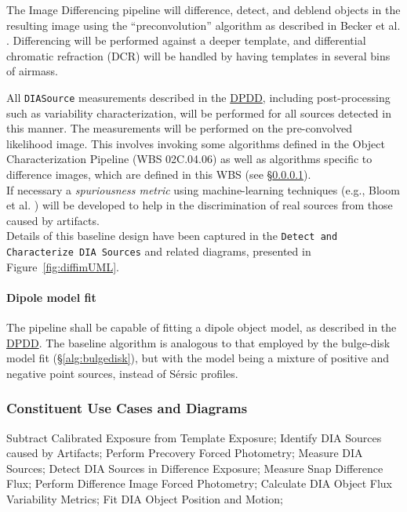 \documentclass[12pt]{article}
\newcommand{\code}[1]{\texttt{#1}}
\newcommand{\DIASource}{\code{DIASource}\xspace}
\newcommand{\ds}[2]{{\color{blue} \href{https://docushare.lsstcorp.org/docushare/dsweb/Get/#1}{#2}}\xspace}
\newcommand{\DPDD}{\ds{LSE-163}{DPDD}}
\newcommand{\wbsObjChar}{WBS 02C.04.06}
\newcommand{\uc}[1]{{\tt #1}}
\begin{document}
The Image Differencing pipeline will difference, detect, and deblend objects in the resulting image using the ``preconvolution'' algorithm as described in Becker et al. \cite{Becker13}.
Differencing will be performed against a deeper template, and differential chromatic refraction (DCR) will be handled by having templates in several bins of airmass.

All \DIASource measurements described in the \DPDD, including post-processing such as variability characterization, will be performed for all sources detected in this manner. The measurements will be performed on the pre-convolved likelihood image. This involves invoking some algorithms defined in the Object Characterization Pipeline (\wbsObjChar{}) as well as algorithms specific to difference images, which are defined in this WBS (see \S\ref{alg:dipole}).
\\

If necessary a \emph{spuriousness metric} using machine-learning techniques (e.g., Bloom et al. \cite{Bloom12}) will be developed to help in the discrimination of real sources from those caused by artifacts.
\\

Details of this baseline design have been captured in the \uc{Detect and Characterize DIA Sources} and related diagrams, presented in Figure~\ref{fig:diffimUML}.

\paragraph{Dipole model fit}
\label{alg:dipole}

The pipeline shall be capable of fitting a dipole object model, as described in the \DPDD{}. The baseline algorithm is analogous to that employed by the bulge-disk model fit (\S\ref{alg:bulgedisk}), but with the model being a mixture of positive and negative point sources, instead of S\'ersic profiles.

\subsubsection{Constituent Use Cases and Diagrams}

Subtract Calibrated Exposure from Template Exposure; Identify DIA Sources caused by Artifacts; Perform Precovery Forced Photometry; Measure DIA Sources; Detect DIA Sources in Difference Exposure; Measure Snap Difference Flux; Perform Difference Image Forced Photometry; Calculate DIA Object Flux Variability Metrics; Fit DIA Object Position and Motion;
\end{document}
